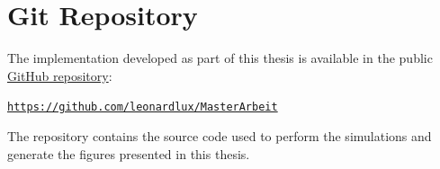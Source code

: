 \chapter{Git Repository}\label{chapter:git_repo}

The implementation developed as part of this thesis is available in the public \href{https://github.com/leonardlux/MasterArbeit}{GitHub repository}:

\begin{center}
 \href{https://github.com/leonardlux/MasterArbeit}{\texttt{https://github.com/leonardlux/MasterArbeit}}
\end{center}

The repository contains the source code used to perform the simulations and generate the figures presented in this thesis.